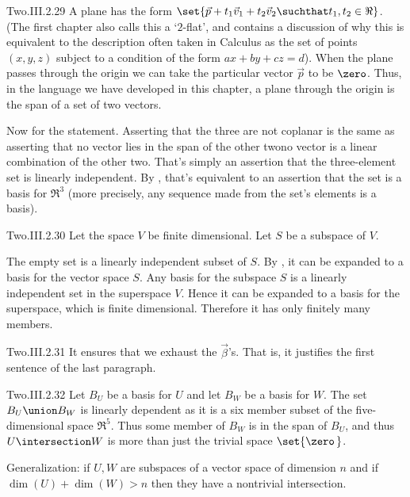 \begin{ans}{Two.III.2.29}
      A plane has the
      form $\set{\vec{p}+t_1\vec{v}_1+t_2\vec{v}_2\suchthat t_1,t_2\in\Re}$.
      (The first chapter also calls this a `$2$-flat', and contains
      a discussion of why this is equivalent to the
      description often taken in Calculus as the set of points $(x,y,z)$
      subject to a condition of the form $ax+by+cz=d$).
      When the plane passes through the origin we can take the particular
      vector $\vec{p}$ to be $\zero$.
      Thus, in the language we have developed in this chapter, a plane through
      the origin is the span of a set of two vectors.

      Now for the statement.
      Asserting that the three are not coplanar is the same as asserting that
      no vector lies in the span of the other two\Dash no vector is a linear
      combination of the other two.
      That's simply an assertion that the three-element set is linearly
      independent.
      By , that's equivalent to an
      assertion that the set is a basis for $\Re^3$ (more precisely,
      any sequence made from the set's elements is a basis).
    
\end{ans}
\begin{ans}{Two.III.2.30}
      Let the space $V$ be finite dimensional.
      Let $S$ be a subspace of $V$.
      \begin{exparts}
        \partsitem The empty set is a linearly independent subset of $S$.
          By , it can be expanded to a basis
          for the vector space $S$.
        \partsitem Any basis for the subspace $S$ is a linearly independent
          set in the superspace $V$.
          Hence it can be expanded to a basis for the superspace, which is
          finite dimensional.
          Therefore it has only finitely many members.
      \end{exparts}
    
\end{ans}
\begin{ans}{Two.III.2.31}
      It ensures that we exhaust the \( \vec{\beta} \)'s.
      That is, it justifies the first sentence of the last paragraph.
    
\end{ans}
\begin{ans}{Two.III.2.32}
       Let \( B_U \) be a basis for \( U \) and let \( B_W \)
       be a basis for \( W \).
       The set \( B_U\union B_W \) is linearly dependent as it is a
       six member subset of the five-dimensional space \( \Re^5 \).
       Thus some member of \( B_W \) is in the span of \( B_U \), and
       thus \( U\intersection W \) is more than just the trivial space
       \( \set{\zero\,} \).

       Generalization:
       if \( U,W \) are subspaces of a vector space of dimension \( n \) and
       if \( \dim(U)+\dim(W)>n \) then they have a nontrivial
       intersection.
    
\end{ans}
